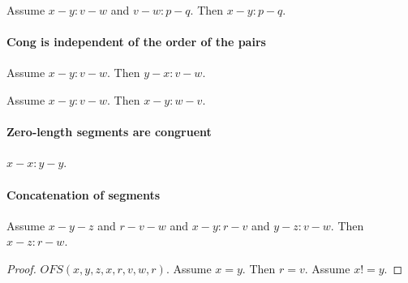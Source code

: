 \documentclass{article}
\begin{document}
  \begin{forthel}
    \begin{lemma}[L2o3]
      Assume $x-y : v-w$ and $v-w : p-q$. Then $x-y : p-q$.
    \end{lemma}
  \end{forthel}


  \paragraph{Cong is independent of the order of the pairs}

  \begin{forthel}
    \begin{lemma}[L2o4]
      Assume $x-y : v-w$. Then $y-x : v-w$.
    \end{lemma}

    \begin{lemma}[L2o5]
      Assume $x-y : v-w$. Then $x-y : w-v$.
    \end{lemma}
  \end{forthel}


  \paragraph{Zero-length segments are congruent}

  \begin{forthel}
    \begin{lemma}[L2o8]
      $x-x : y-y$.
    \end{lemma}
  \end{forthel}


  \paragraph{Concatenation of segments}

  \begin{forthel}
    \begin{lemma}[L2o11]
      Assume $x-y-z$ and $r-v-w$ and $x-y : r-v$ and $y-z : v-w$. Then $x-z : r-w$.
    \end{lemma}


    \begin{proof}
      $OFS(x,y,z,x,r,v,w,r)$.       %
      Assume $x = y$. Then $r = v$. %
      Assume $x != y$.              %
    \end{proof}
  \end{forthel}
\end{document}
